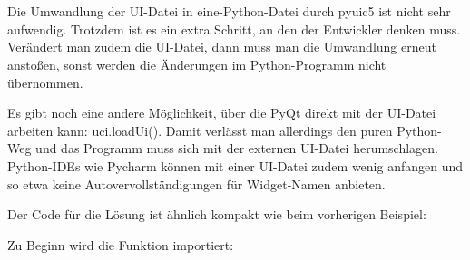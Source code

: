 \section{}

Die Umwandlung der UI-Datei in eine-Python-Datei durch pyuic5 ist nicht sehr aufwendig. Trotzdem ist es ein extra Schritt, an den der Entwickler denken muss. Verändert man zudem die UI-Datei, dann muss man die Umwandlung erneut anstoßen, sonst werden die Änderungen im Python-Programm nicht übernommen.

Es gibt noch eine andere Möglichkeit, über die PyQt direkt mit der UI-Datei arbeiten kann: uci.loadUi(). Damit verlässt man allerdings den puren Python-Weg und das Programm muss sich mit der externen UI-Datei herumschlagen. Python-IDEs wie Pycharm können mit einer UI-Datei zudem wenig anfangen und so etwa keine Autovervollständigungen für Widget-Namen anbieten.

Der Code für die Lösung  ist ähnlich kompakt wie beim vorherigen Beispiel:


\medskip




\PYTHON{}





\PYTHON{}


\PYTHON{}



\PYTHON{}


\medskip

Zu Beginn wird die Funktion  importiert:

\medskip


\medskip

